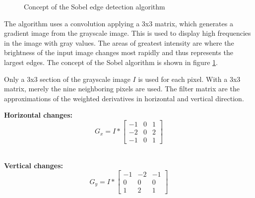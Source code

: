 \begin{figure}[b]
    \centering
    \begin{adjustbox}{width=0.5\textwidth}
    	
    \end{adjustbox}
    \caption{Concept of the Sobel edge detection algorithm}
    \label{fig:sobel}
\end{figure}
	
The algorithm uses a convolution applying a 3x3 matrix, which generates a gradient image from the grayscale image. This is used to display high frequencies in the image with gray values. The areas of greatest intensity are where the brightness of the input image changes most rapidly and thus represents the largest edges. The concept of the Sobel algorithm is shown in figure \ref{fig:sobel}. 

Only a 3x3 section of the grayscale image $I$ is used for each pixel. With a 3x3 matrix, merely the nine neighboring pixels are used. The filter matrix are the approximations of the weighted derivatives in horizontal and vertical direction. \\

\noindent\begin{minipage}{.5\linewidth}

\textbf{Horizontal changes:}
\begin{equation}
    G_{x} = I * \begin{bmatrix}
                -1 & 0 & 1 \\ 
                -2 & 0 & 2 \\ 
                -1 & 0 & 1
                \end{bmatrix}
    \label{eq:gx_derivative}
\end{equation} \\

\end{minipage}%
\begin{minipage}{.5\linewidth}

\textbf{Vertical changes:}
\begin{equation}
    G_{y} = I * \begin{bmatrix}
                -1 & -2 & -1 \\ 
                0 & 0 & 0 \\ 
                1 & 2 & 1
                \end{bmatrix}
    \label{eq:gx_derivative}
\end{equation} \\

\end{minipage}


